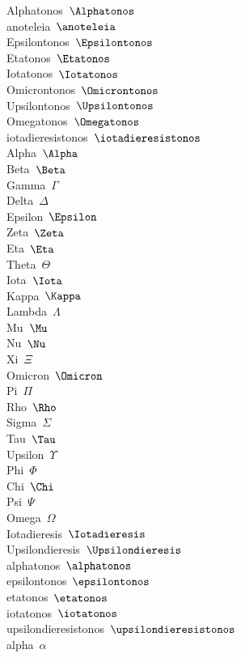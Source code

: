 \documentclass[a4paper,12pt]{article}
\begin{document}
\begin{multicols}{4}
\noindent
Alphatonos\ $\Alphatonos$\\
anoteleia\ $\anoteleia$\\
Epsilontonos\ $\Epsilontonos$\\
Etatonos\ $\Etatonos$\\
Iotatonos\ $\Iotatonos$\\
Omicrontonos\ $\Omicrontonos$\\
Upsilontonos\ $\Upsilontonos$\\
Omegatonos\ $\Omegatonos$\\
iotadieresistonos\ $\iotadieresistonos$\\
Alpha\ $\Alpha$\\
Beta\ $\Beta$\\
Gamma\ $\Gamma$\\
Delta\ $\Delta$\\
Epsilon\ $\Epsilon$\\
Zeta\ $\Zeta$\\
Eta\ $\Eta$\\
Theta\ $\Theta$\\
Iota\ $\Iota$\\
Kappa\ $\Kappa$\\
Lambda\ $\Lambda$\\
Mu\ $\Mu$\\
Nu\ $\Nu$\\
Xi\ $\Xi$\\
Omicron\ $\Omicron$\\
Pi\ $\Pi$\\
Rho\ $\Rho$\\
Sigma\ $\Sigma$\\
Tau\ $\Tau$\\
Upsilon\ $\Upsilon$\\
Phi\ $\Phi$\\
Chi\ $\Chi$\\
Psi\ $\Psi$\\
Omega\ $\Omega$\\
Iotadieresis\ $\Iotadieresis$\\
Upsilondieresis\ $\Upsilondieresis$\\
alphatonos\ $\alphatonos$\\
epsilontonos\ $\epsilontonos$\\
etatonos\ $\etatonos$\\
iotatonos\ $\iotatonos$\\
upsilondieresistonos\ $\upsilondieresistonos$\\
alpha\ $\alpha$\\

\end{multicols}
\end{document}
